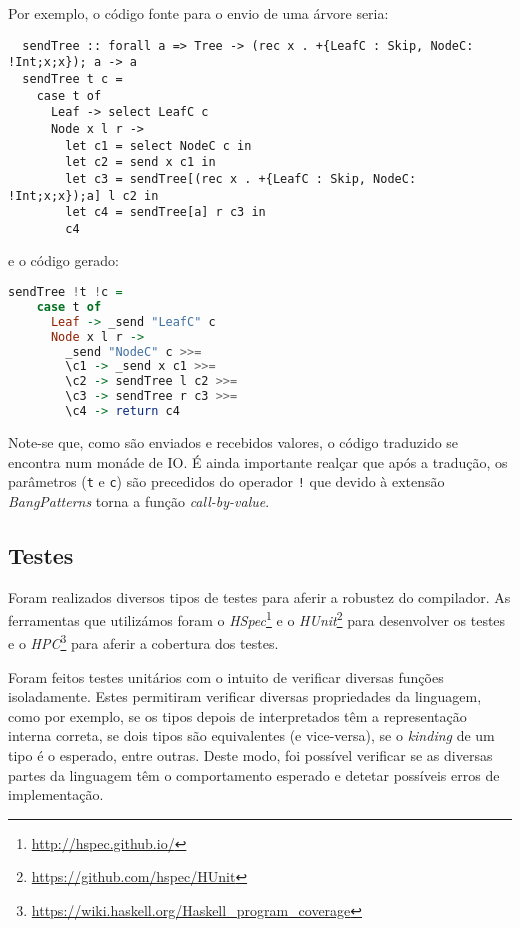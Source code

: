 \begin{itemize}
Por exemplo, o código fonte para o envio de uma árvore seria:

\begin{lstlisting}
  sendTree :: forall a => Tree -> (rec x . +{LeafC : Skip, NodeC: !Int;x;x}); a -> a
  sendTree t c =
    case t of
      Leaf -> select LeafC c
      Node x l r ->
        let c1 = select NodeC c in
        let c2 = send x c1 in
        let c3 = sendTree[(rec x . +{LeafC : Skip, NodeC: !Int;x;x});a] l c2 in
        let c4 = sendTree[a] r c3 in
        c4
\end{lstlisting}

e o código gerado:
\begin{lstlisting}[language=Haskell, style=eclipse]
  sendTree !t !c =
    case t of 
      Leaf -> _send "LeafC" c 
      Node x l r ->
        _send "NodeC" c >>=
        \c1 -> _send x c1 >>=
        \c2 -> sendTree l c2 >>=
        \c3 -> sendTree r c3 >>=
        \c4 -> return c4 
\end{lstlisting}

Note-se que, como são enviados e recebidos valores, o código traduzido se encontra num monáde de IO. É ainda importante realçar que após a tradução, os parâmetros (\lstinline|t| e \lstinline|c|) são precedidos do operador \lstinline|!| que devido à extensão \textit{BangPatterns} torna a função \textit{call-by-value}.

\end{itemize}

\subsection{Testes}

Foram realizados diversos tipos de testes para aferir a robustez do compilador. As ferramentas que utilizámos foram o \textit{HSpec}\footnote{\url{http://hspec.github.io/}} e o \textit{HUnit}\footnote{\url{https://github.com/hspec/HUnit}} para desenvolver os testes e o \textit{HPC}\footnote{\url{https://wiki.haskell.org/Haskell_program_coverage}} para aferir a cobertura dos testes.

Foram feitos testes unitários com o intuito de verificar diversas funções isoladamente. Estes permitiram verificar diversas propriedades da linguagem, como por exemplo, se os tipos depois de interpretados têm a representação interna correta, se dois tipos são equivalentes (e vice-versa), se o \textit{kinding} de um tipo é o esperado, entre outras. Deste modo, foi possível verificar se as diversas partes da linguagem têm o comportamento esperado e detetar possíveis erros de implementação.

